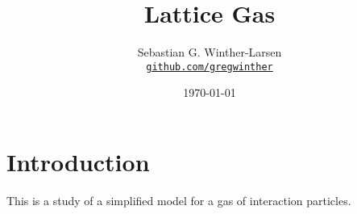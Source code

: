 \documentclass[11pt]{amsart}
\title{Lattice Gas \\
	\hrulefill\fbox{FYS2160}\hrulefill}
\author[Winther-Larsen]{Sebastian G. Winther-Larsen \\
	\href{https://github.com/gregwinther/FYS2160/}{\texttt{github.com/gregwinther}}}
\date{\today}
\begin{document}
\maketitle

\section{Introduction}
This is a study of a simplified model for a gas of interaction particles.
\end{document}

